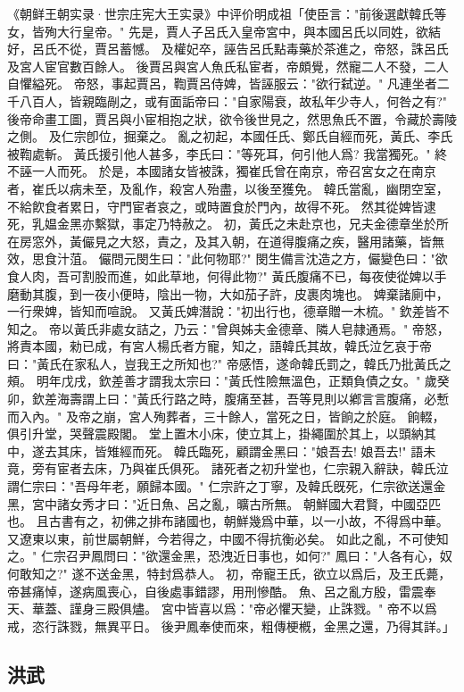 《朝鲜王朝实录·世宗庄宪大王实录》中评价明成祖「使臣言："前後選獻韓氏等女，皆殉大行皇帝。" 先是，賈人子呂氏入皇帝宮中，與本國呂氏以同姓，欲結好，呂氏不從，賈呂蓄憾。 及權妃卒，誣告呂氏點毒藥於茶進之，帝怒，誅呂氏及宮人宦官數百餘人。 後賈呂與宮人魚氏私宦者，帝頗覺，然寵二人不發，二人自懼縊死。 帝怒，事起賈呂，鞫賈呂侍婢，皆誣服云："欲行弑逆。" 凡連坐者二千八百人，皆親臨剮之，或有面詬帝曰："自家陽衰，故私年少寺人，何咎之有?" 後帝命畫工圖，賈呂與小宦相抱之狀，欲令後世見之，然思魚氏不置，令藏於壽陵之側。 及仁宗卽位，掘棄之。 亂之初起，本國任氏、鄭氏自經而死，黃氏、李氏被鞫處斬。 黃氏援引他人甚多，李氏曰："等死耳，何引他人爲? 我當獨死。" 終不誣一人而死。 於是，本國諸女皆被誅，獨崔氏曾在南京，帝召宮女之在南京者，崔氏以病未至，及亂作，殺宮人殆盡，以後至獲免。 韓氏當亂，幽閉空室，不給飮食者累日，守門宦者哀之，或時置食於門內，故得不死。 然其從婢皆逮死，乳媪金黑亦繫獄，事定乃特赦之。 初，黃氏之未赴京也，兄夫金德章坐於所在房窓外，黃儼見之大怒，責之，及其入朝，在道得腹痛之疾，醫用諸藥，皆無效，思食汁菹。 儼問元閔生曰："此何物耶?" 閔生備言沈造之方，儼變色曰："欲食人肉，吾可割股而進，如此草地，何得此物?" 黃氏腹痛不已，每夜使從婢以手磨動其腹，到一夜小便時，陰出一物，大如茄子許，皮裹肉塊也。 婢棄諸廁中，一行衆婢，皆知而喧說。 又黃氏婢潛說："初出行也，德章贈一木梳。" 欽差皆不知之。 帝以黃氏非處女詰之，乃云："曾與姊夫金德章、隣人皂隷通焉。" 帝怒，將責本國，勑已成，有宮人楊氏者方寵，知之，語韓氏其故，韓氏泣乞哀于帝曰："黃氏在家私人，豈我王之所知也?" 帝感悟，遂命韓氏罰之，韓氏乃批黃氏之頰。 明年戊戌，欽差善才謂我太宗曰："黃氏性險無溫色，正類負債之女。" 歲癸卯，欽差海壽謂上曰："黃氏行路之時，腹痛至甚，吾等見則以鄕言言腹痛，必慙而入內。" 及帝之崩，宮人殉葬者，三十餘人，當死之日，皆餉之於庭。 餉輟，俱引升堂，哭聲震殿閣。 堂上置木小床，使立其上，掛繩圍於其上，以頭納其中，遂去其床，皆雉經而死。 韓氏臨死，顧謂金黑曰："娘吾去! 娘吾去!" 語未竟，旁有宦者去床，乃與崔氏俱死。 諸死者之初升堂也，仁宗親入辭訣，韓氏泣謂仁宗曰："吾母年老，願歸本國。" 仁宗許之丁寧，及韓氏旣死，仁宗欲送還金黑，宮中諸女秀才曰："近日魚、呂之亂，曠古所無。 朝鮮國大君賢，中國亞匹也。 且古書有之，初佛之排布諸國也，朝鮮幾爲中華，以一小故，不得爲中華。 又遼東以東，前世屬朝鮮，今若得之，中國不得抗衡必矣。 如此之亂，不可使知之。" 仁宗召尹鳳問曰："欲還金黑，恐洩近日事也，如何?" 鳳曰："人各有心，奴何敢知之?" 遂不送金黑，特封爲恭人。 初，帝寵王氏，欲立以爲后，及王氏薨，帝甚痛悼，遂病風喪心，自後處事錯謬，用刑慘酷。 魚、呂之亂方殷，雷震奉天、華蓋、謹身三殿俱燼。 宮中皆喜以爲："帝必懼天變，止誅戮。" 帝不以爲戒，恣行誅戮，無異平日。 後尹鳳奉使而來，粗傳梗槪，金黑之還，乃得其詳。」

\subsection{洪武}

